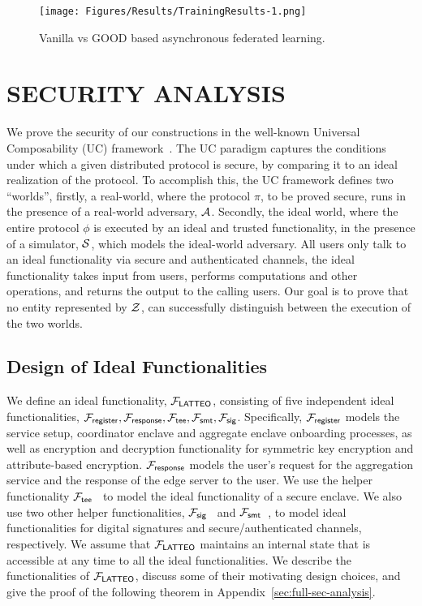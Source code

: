 \begin{figure*}[h]
\centering
  \texttt{[image: Figures/Results/TrainingResults-1.png]} 
  \vspace{-0.23in}
  \caption{Vanilla vs GOOD based asynchronous federated learning.}
  \label{fig:detection_correction} 
  \vspace{-0.15in}
\end{figure*}

\section{SECURITY ANALYSIS}
\label{formalsec} 
We prove the security of our constructions in the well-known Universal Composability (UC) framework~\cite{Canetti01}. The UC paradigm captures the conditions under which a given distributed protocol is secure, by comparing it to an ideal realization of the protocol. To accomplish this, the UC framework defines two “worlds”, firstly, a real-world, where the protocol $\pi$, to be proved secure, runs in the presence of a real-world adversary, $\mathcal{A}$. Secondly, the ideal world, where the entire protocol $\phi$ is executed by an ideal and trusted functionality, in the presence of a simulator, $\mathcal{S}$, which models the ideal-world adversary. All users only talk to an ideal functionality via secure and authenticated channels, the ideal functionality takes input from users, performs computations and other operations, and returns the output to the calling users. Our goal is to prove that no entity represented by $\mathcal{Z}$, can successfully distinguish between the execution of the two worlds.

\subsection{Design of Ideal Functionalities}
We define an ideal functionality, $\mathcal{F}_{\mathsf{LATTEO}}$, consisting of five independent ideal functionalities, $\fregister, \fresp, \ftee, %
\fsmt, \fsig$. %
Specifically, $\mathcal{F}_{\mathsf{register}}$ models the service setup, coordinator enclave and aggregate enclave onboarding processes, as well as encryption and decryption functionality for symmetric key encryption and attribute-based encryption. $\mathcal{F}_{\mathsf{response}}$ models the user's request for the aggregation service and the response of the edge server to the user. We use the helper functionality $\mathcal{F}_{\mathsf{tee}}$~\cite{pass2017formal} to model the ideal functionality of a secure enclave.%
We also use two other helper functionalities, $\mathcal{F}_{\mathsf{sig}}$~\cite{canetti2004universally} and $\mathcal{F}_{\mathsf{smt}}$~\cite{Canetti01}, to model ideal functionalities for digital signatures and secure/authenticated channels, respectively.
We assume that $\mathcal{F}_{\mathsf{LATTEO}}$ maintains an internal state that is accessible at any time to all the ideal functionalities.
We describe the functionalities of $\mathcal{F}_{\mathsf{LATTEO}}$, discuss some of their motivating design choices, and give the proof of the following theorem in Appendix~\ref{sec:full-sec-analysis}.


